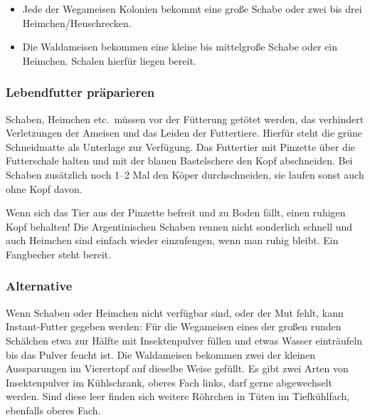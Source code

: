 \begin{itemize}
  \item Jede der Wegameisen Kolonien bekommt eine große Schabe
        oder zwei bis drei Heimchen/Heuschrecken.
  \item Die Waldameisen bekommen eine kleine bis mittelgroße Schabe oder ein Heimchen.
        Schalen hierfür liegen bereit.
\end{itemize}

\subsubsection{Lebendfutter präparieren}
Schaben, Heimchen etc.\ müssen vor der Fütterung getötet werden,
das verhindert Verletzungen der Ameisen und das Leiden der Futtertiere.
Hierfür steht die grüne Schneidmatte als Unterlage zur Verfügung.
Das Futtertier mit Pinzette über die Futterschale halten und mit der blauen Bastelschere den Kopf abschneiden.
Bei Schaben zusätzlich noch 1--2 Mal den Köper durchschneiden, sie laufen sonst auch ohne Kopf davon.

Wenn sich das Tier aus der Pinzette befreit und zu Boden fällt, einen ruhigen Kopf behalten!
Die Argentinischen Schaben rennen nicht sonderlich schnell
und auch Heimchen sind einfach wieder einzufengen, wenn man ruhig bleibt.
Ein Fangbecher steht bereit.

\subsubsection{Alternative}
Wenn Schaben oder Heimchen nicht verfügbar sind, oder der Mut fehlt, kann Instant-Futter gegeben werden:
Für die Wegameisen eines der großen runden Schälchen etwa zur Hälfte mit Insektenpulver füllen
 und etwas Wasser einträufeln bis das Pulver feucht ist.
Die Waldameisen bekommen zwei der kleinen Aussparungen im Vierertopf auf dieselbe Weise gefüllt.
Es gibt zwei Arten von Insektenpulver im Kühlschrank, oberes Fach links, darf gerne abgewechselt werden.
Sind diese leer finden sich weitere Röhrchen in Tüten im Tiefkühlfach, ebenfalls oberes Fach.

